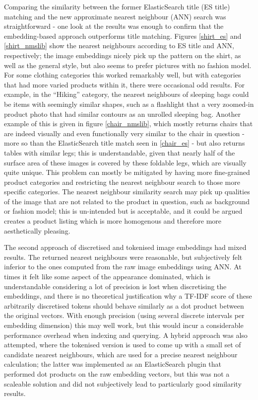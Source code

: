 Comparing the similarity between the former ElasticSearch title (ES title) matching and the new approximate nearest neighbour (ANN) search was straightforward - one look at the results was enough to confirm that the embedding-based approach outperforms title matching.
Figures \ref{shirt_es} and \ref{shirt_nmslib} show the nearest neighbours according to ES title and ANN, respectively; the image embeddings nicely pick up the pattern on the shirt, as well as the general style, but also seems to prefer pictures with no fashion model.
For some clothing categories this worked remarkably well, but with categories that had more varied products within it, there were occasional odd results.
For example, in the ``Hiking'' category, the nearest neighbours of sleeping bags could be items with seemingly similar shapes, such as a flashlight that a very zoomed-in product photo that had similar contours as an unrolled sleeping bag.
Another example of this is given in figure \ref{chair_nmslib}, which mostly returns chairs that are indeed visually and even functionally very similar to the chair in question - more so than the ElasticSearch title match seen in \ref{chair_es} - but also returns tables with similar legs; this is understandable, given that nearly half of the surface area of these images is covered by these foldable legs, which are visually quite unique.
This problem can mostly be mitigated by having more fine-grained product categories and restricting the nearest neighbour search to those more specific categories.
The nearest neighbour similarity search may pick up qualities of the image that are not related to the product in question, such as background or fashion model; this is un-intended but is acceptable, and it could be argued creates a product listing which is more homogenous and therefore more aesthetically pleasing.

The second approach of discretised and tokenised image embeddings had mixed results.
The returned nearest neighbours were reasonable, but subjectively felt inferior to the ones computed from the raw image embeddings using ANN.
At times it felt like some aspect of the appearance dominated, which is understandable considering a lot of precision is lost when discretising the embeddings, and there is no theoretical justification why a TF-IDF score of these arbitrarily discretised tokens should behave similarly as a dot product between the original vectors.
With enough precision (using several discrete intervals per embedding dimension) this may well work, but this would incur a considerable performance overhead when indexing and querying.
A hybrid approach was also attempted, where the tokenised version is used to come up with a small set of candidate nearest neighbours, which are used for a precise nearest neighbour calculation; the latter was implemented as an ElasticSearch plugin that performed dot products on the raw embedding vectors, but this was not a scaleable solution and did not subjectively lead to particularly good similarity results.

